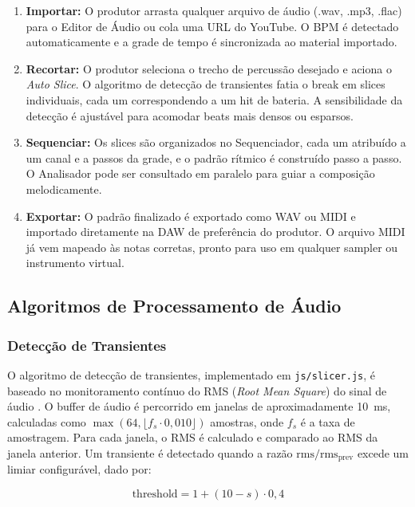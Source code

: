 \documentclass[portuguese]{sbc2025}
\begin{document}
\begin{enumerate}
\item \textbf{Importar:} O produtor arrasta qualquer arquivo de áudio (.wav, .mp3, .flac) para o Editor de Áudio ou cola uma URL do YouTube. O BPM é detectado automaticamente e a grade de tempo é sincronizada ao material importado.

\item \textbf{Recortar:} O produtor seleciona o trecho de percussão desejado e aciona o \textit{Auto Slice}. O algoritmo de detecção de transientes fatia o break em slices individuais, cada um correspondendo a um hit de bateria. A sensibilidade da detecção é ajustável para acomodar beats mais densos ou esparsos.

\item \textbf{Sequenciar:} Os slices são organizados no Sequenciador, cada um atribuído a um canal e a passos da grade, e o padrão rítmico é construído passo a passo. O Analisador pode ser consultado em paralelo para guiar a composição melodicamente.

\item \textbf{Exportar:} O padrão finalizado é exportado como WAV ou MIDI e importado diretamente na DAW de preferência do produtor. O arquivo MIDI já vem mapeado às notas corretas, pronto para uso em qualquer sampler ou instrumento virtual.
\end{enumerate}

\subsection{Algoritmos de Processamento de Áudio}

\subsubsection{Detecção de Transientes}
\label{sec:transientes}

O algoritmo de detecção de transientes, implementado em \texttt{js/slicer.js}, é baseado no monitoramento contínuo do RMS (\textit{Root Mean Square}) do sinal de áudio \citep{bello2005tutorial}. O buffer de áudio é percorrido em janelas de aproximadamente 10~ms, calculadas como $\max(64,\lfloor f_s \cdot 0{,}010 \rfloor)$ amostras, onde $f_s$ é a taxa de amostragem. Para cada janela, o RMS é calculado e comparado ao RMS da janela anterior. Um transiente é detectado quando a razão $\text{rms}/\text{rms}_{\text{prev}}$ excede um limiar configurável, dado por:

$$\text{threshold} = 1 + (10 - s) \cdot 0{,}4$$
\end{document}
